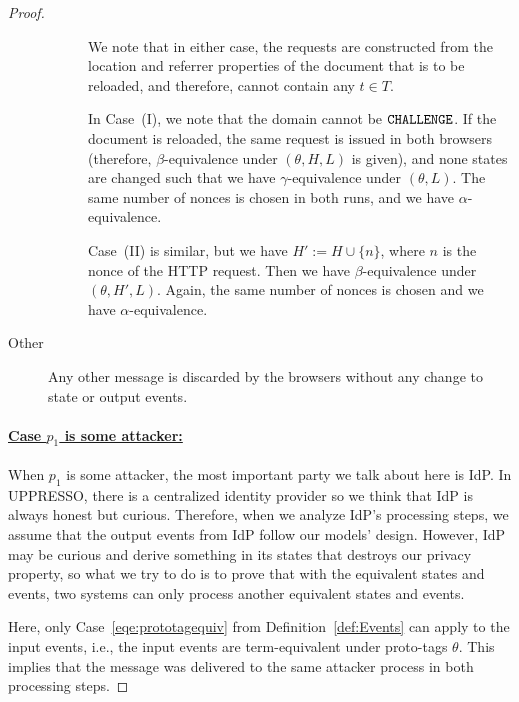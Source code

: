 \begin{proof}
\begin{description}
\begin{description}
        We note that in either case, the requests are constructed from
        the location and referrer properties of the document that is to
        be reloaded, and therefore, cannot contain any $t\in T$.
  
        In Case~(I), we note that the domain cannot be
        $\mathtt{CHALLENGE}$. If the document is reloaded, the same 
        request is issued in both browsers (therefore,
        $\beta$-equivalence under $(\theta, H, L)$ is given), and 
        none states are changed such that we have
        $\gamma$-equivalence under $(\theta, L)$. The same number of
        nonces is chosen in both runs, and we have
        $\alpha$-equivalence.
  
        Case~(II) is similar, but we have $H' := H \cup \{n\}$, where
        $n$ is the nonce of the HTTP request. 
        Then we have $\beta$-equivalence under
        $(\theta,H',L)$. Again, the same number of nonces is chosen and
        we have $\alpha$-equivalence. 
        \end{description}
      \item[Other] Any other message is discarded by the browsers 
        without any change to state or output events.
    \end{description}
  
    \paragraph{\underline{Case $p_1$ is some attacker:}}

    When $p_1$ is some attacker, the most important party we talk about here is IdP.
    In UPPRESSO, there is a centralized identity provider so we think that IdP is always honest but curious.
    Therefore, when we analyze IdP's processing steps, 
    we assume that the output events from IdP follow our models' design.
    However, IdP may be curious and derive something in its states that destroys our privacy property, 
    so what we try to do is to prove that with the equivalent states and events, 
    two systems can only process another equivalent states and events.
    
    Here, only Case~\ref{eqe:prototagequiv} from Definition~\ref{def:Events} can apply to the input events,
    i.e., the input events are term-equivalent under proto-tags $\theta$. 
    This implies that the message was delivered to the same attacker process in both processing steps. 
    

\end{proof}
